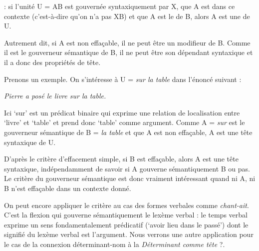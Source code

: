 {: si l’unité U = AB est gouvernée syntaxiquement par X, que A est  dans ce contexte (c'est-à-dire qu'on n'a pas XB)
et que A est le  de B, alors A est une  de U.}

Autrement dit, si A est non effaçable, il ne peut être un modifieur de B. Comme il est le gouverneur sémantique de B, il ne peut être son dépendant syntaxique et il a donc des propriétés de tête.

Prenons un exemple. On s’intéresse à U = \textit{sur la table} dans l’énoncé suivant :

\ea \textit{Pierre a posé le livre sur la table.}\z

Ici ‘sur’ est un prédicat binaire qui exprime une relation de localisation entre ‘livre’ et ‘table’ et prend donc ‘table’ comme argument. Comme A = \textit{sur} est le gouverneur sémantique de B = \textit{la table} et que A est non effaçable, A est une tête syntaxique de U.

D’après le critère d’effacement simple, si B est effaçable, alors A est une tête syntaxique, indépendamment de savoir si A gouverne sémantiquement B ou pas. Le critère du gouverneur sémantique est donc vraiment intéressant quand ni A, ni B n’est effaçable dans un contexte donné.

On peut encore appliquer le critère au cas des formes verbales comme \textit{chant-ait}. C’est la flexion qui gouverne sémantiquement le lexème verbal : le temps verbal exprime un sens fondamentalement prédicatif (‘avoir lieu dans le passé’) dont le signifié du lexème verbal est l’argument. Nous verrons une autre application pour le cas de la connexion déterminant-nom à la  \textit{Déterminant comme tête} ?.

